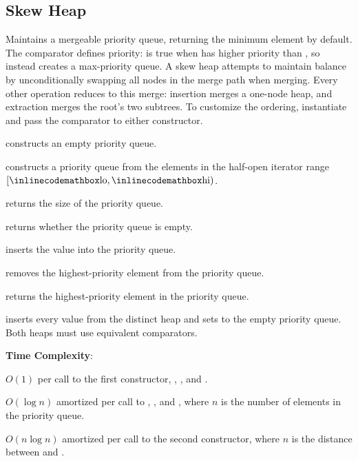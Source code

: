 \subsection{Skew Heap}
\label{sec:2.3.3}
Maintains a mergeable priority queue, returning the minimum element by default. The comparator  defines priority:  is true when  has higher priority than , so  instead creates a max-priority queue. A skew heap attempts to maintain balance by unconditionally swapping all nodes in the merge path when merging. Every other operation reduces to this merge: insertion merges a one-node heap, and extraction merges the root's two subtrees. To customize the ordering, instantiate  and pass the comparator to either constructor.

\begin{compactitem}
  \item {} constructs an empty priority queue.
  \item {} constructs a priority queue from the elements in the half-open iterator range $[{\inlinecodemath{lo}}, {\inlinecodemath{hi}})$.
  \item {} returns the size of the priority queue.
  \item {} returns whether the priority queue is empty.
  \item {} inserts the value  into the priority queue.
  \item {} removes the highest-priority element from the priority queue.
  \item {} returns the highest-priority element in the priority queue.
  \item {} inserts every value from the distinct heap  and sets  to the empty priority queue. Both heaps must use equivalent comparators.
\end{compactitem}

\textbf{Time Complexity}:
\begin{compactitem}
  \item $O(1)$ per call to the first constructor, , , and .
  \item $O(\log n)$ amortized per call to , , and , where $n$ is the number of elements in the priority queue.
  \item $O(n \log n)$ amortized per call to the second constructor, where $n$ is the distance between  and .
\end{compactitem}

